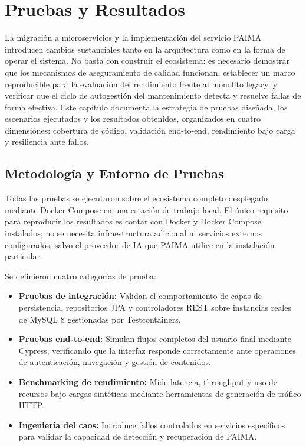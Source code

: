 \chapter{Pruebas y Resultados}
\label{ch:pruebas}
\pagestyle{fancy}

La migración a microservicios y la implementación del servicio PAIMA introducen
cambios sustanciales tanto en la arquitectura como en la forma de operar el sistema.
No basta con construir el ecosistema: es necesario demostrar que los mecanismos de
aseguramiento de calidad funcionan, establecer un marco reproducible para la
evaluación del rendimiento frente al monolito legacy, y verificar que el ciclo de
autogestión del mantenimiento detecta y resuelve fallas de forma efectiva. Este capítulo documenta la estrategia de pruebas diseñada,
los escenarios ejecutados y los resultados obtenidos, organizados en cuatro
dimensiones: cobertura de código, validación end-to-end, rendimiento bajo carga y
resiliencia ante fallos.

\section{Metodología y Entorno de Pruebas}

Todas las pruebas se ejecutaron sobre el ecosistema completo desplegado mediante
Docker Compose en una estación de trabajo local. El único requisito para reproducir
los resultados es contar con Docker y Docker Compose instalados; no se necesita
infraestructura adicional ni servicios externos configurados, salvo el proveedor de
IA que PAIMA utilice en la instalación particular.

Se definieron cuatro categorías de prueba:

\begin{itemize}
    \item \textbf{Pruebas de integración:} Validan el comportamiento de capas de
    persistencia, repositorios JPA y controladores REST sobre instancias reales de
    MySQL 8 gestionadas por Testcontainers.
    \item \textbf{Pruebas end-to-end:} Simulan flujos completos del usuario final
    mediante Cypress, verificando que la interfaz responde correctamente ante
    operaciones de autenticación, navegación y gestión de contenidos.
    \item \textbf{Benchmarking de rendimiento:} Mide latencia, throughput y uso de
    recursos bajo cargas sintéticas mediante herramientas de generación de tráfico
    HTTP.
    \item \textbf{Ingeniería del caos:} Introduce fallos controlados en servicios
    específicos para validar la capacidad de detección y recuperación de PAIMA.
\end{itemize}

